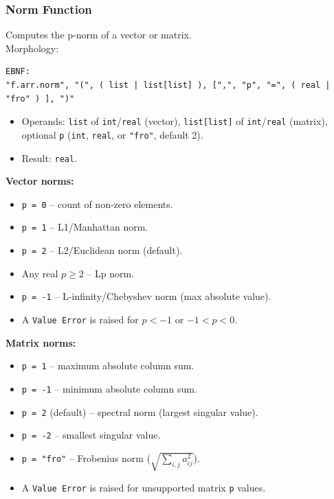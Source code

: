 \subsubsection{Norm Function}
Computes the p-norm of a vector or matrix. \\
Morphology:
\begin{verbatim}
EBNF:
"f.arr.norm", "(", ( list | list[list] ), [",", "p", "=", ( real | "fro" ) ], ")"
\end{verbatim}
\begin{itemize}
\item Operands: \texttt{list} of \texttt{int}/\texttt{real} (vector), \texttt{list[list]} of \texttt{int}/\texttt{real} (matrix), optional \texttt{p} (\texttt{int}, \texttt{real}, or \texttt{"fro"}, default 2).
\item Result: \texttt{real}.
\end{itemize}

\textbf{Vector norms:}
\begin{itemize}
\item \texttt{p = 0} -- count of non-zero elements.
\item \texttt{p = 1} -- L1/Manhattan norm.
\item \texttt{p = 2} -- L2/Euclidean norm (default).
\item Any real $p \geq 2$ -- Lp norm.
\item \texttt{p = -1} -- L-infinity/Chebyshev norm (max absolute value).
\item A \texttt{Value Error} is raised for $p < -1$ or $-1 < p < 0$.
\end{itemize}

\textbf{Matrix norms:}
\begin{itemize}
\item \texttt{p = 1} -- maximum absolute column sum.
\item \texttt{p = -1} -- minimum absolute column sum.
\item \texttt{p = 2} (default) -- spectral norm (largest singular value).
\item \texttt{p = -2} -- smallest singular value.
\item \texttt{p = "fro"} -- Frobenius norm ($\sqrt{\sum_{i,j} a_{ij}^2}$).
\item A \texttt{Value Error} is raised for unsupported matrix \texttt{p} values.
\end{itemize}

